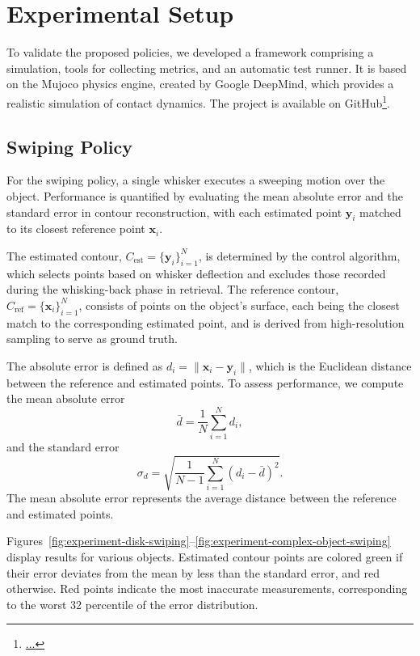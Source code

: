 
\chapter{Experimental Setup}

To validate the proposed policies, we developed a framework comprising a simulation, tools for collecting metrics, and an automatic test runner.
It is based on the Mujoco physics engine, created by Google DeepMind, which provides a realistic simulation of contact dynamics.
The project is available on GitHub\footnote{\url{...}}.


\section{Swiping Policy} \label{sec:swiping-policy}

For the swiping policy, a single whisker executes a sweeping motion over the object.
Performance is quantified by evaluating the mean absolute error and the standard error in contour reconstruction, with each estimated point $\mathbf{y}_i$ matched to its closest reference point $\mathbf{x}_i$.

The estimated contour, $C_{\text{est}} = \{\mathbf{y}_i\}_{i=1}^N$, is determined by the control algorithm, which selects points based on whisker deflection and excludes those recorded during the whisking-back phase in retrieval.
The reference contour, $C_{\text{ref}} = \{\mathbf{x}_i\}_{i=1}^N$, consists of points on the object's surface, each being the closest match to the corresponding estimated point, and is derived from high-resolution sampling to serve as ground truth.

The absolute error is defined as $d_i = \|\mathbf{x}_i - \mathbf{y}_i\|$, which is the Euclidean distance between the reference and estimated points.
To assess performance, we compute the mean absolute error
\[
    \bar{d} = \frac{1}{N}\sum_{i=1}^{N} d_i,
\]
and the standard error
\[
    \sigma_d = \sqrt{\frac{1}{N-1}\sum_{i=1}^{N} (d_i - \bar{d})^2}.
\]
The mean absolute error represents the average distance between the reference and estimated points.

Figures~\ref{fig:experiment-disk-swiping}--\ref{fig:experiment-complex-object-swiping} display results for various objects.
Estimated contour points are colored green if their error deviates from the mean by less than the standard error, and red otherwise.
Red points indicate the most inaccurate measurements, corresponding to the worst 32 percentile of the error distribution.

